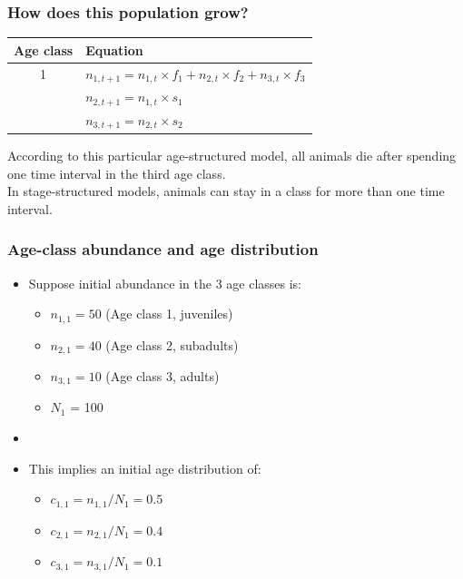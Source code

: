 \documentclass[color=usenames,dvipsnames]{beamer}\usepackage[]{graphicx}\usepackage[]{xcolor}
\begin{document}
\begin{frame}
  \frametitle{How does this population grow?}
  \large
  \begin{center}
    \begin{tabular}{cl}
      \hline
      Age class & Equation \\
      \hline
      1 & $n_{1,t+1} = n_{1,t} \times f_1 + n_{2,t} \times f_2 + n_{3,t} \times f_3$ \\ \pause
      2 & $n_{2,t+1} = n_{1,t} \times s_{1}$ \\ \pause
      3 & $n_{3,t+1} = n_{2,t} \times s_{2}$ \\
      \hline
    \end{tabular}
  \end{center}
  \normalsize
  \pause
  \vfill
  According to this particular age-structured model, all animals die
  after spending one time interval in the third age class. \\  
  \pause
  \vfill
  In stage-structured models, animals can stay in a class for
  more than one time interval. 
\end{frame}





\begin{frame}
  \frametitle{Age-class abundance and age distribution}
  \large
  \begin{itemize}%
    \item<1-> Suppose initial abundance in the 3 age classes is:
      \begin{itemize} \large
        \item $n_{1,1} = 50$ (Age class 1, juveniles)
        \item $n_{2,1} = 40$ (Age class 2, subadults)
        \item $n_{3,1} = 10$ (Age class 3, adults)
        \item $N_1$ = 100
      \end{itemize}
    \item[]
    \item<2-> This implies an initial age distribution of:
      \begin{itemize} \large
        \item  $c_{1,1} = n_{1,1}/N_1 = 0.5$
        \item  $c_{2,1} = n_{2,1}/N_1 = 0.4$
        \item  $c_{3,1} = n_{3,1}/N_1 = 0.1$
      \end{itemize}
  \end{itemize}
  \vfill
\end{frame}
\end{document}
